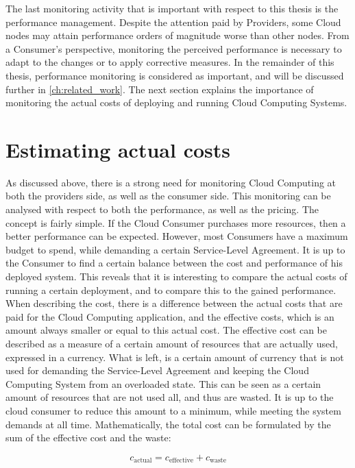 \noindent
The last monitoring activity that is important with respect to this thesis is the performance management. Despite the attention paid by Providers, some Cloud nodes may attain performance orders of magnitude worse than other nodes. From a Consumer's perspective, monitoring the perceived performance is necessary to adapt to the changes or to apply corrective measures. In the remainder of this thesis, performance monitoring is considered as important, and will be discussed further in \autoref{ch:related_work}. The next section explains the importance of monitoring the actual costs of deploying and running Cloud Computing Systems.

\section{Estimating actual costs} \label{sec:intro_pricing}
As discussed above, there is a strong need for monitoring Cloud Computing at both the providers side, as well as the consumer side. This monitoring can be analysed with respect to both the performance, as well as the pricing. The concept is fairly simple. If the Cloud Consumer purchases more resources, then a better performance can be expected. However, most Consumers have a maximum budget to spend, while demanding a certain Service-Level Agreement. It is up to the Consumer to find a certain balance between the cost and performance of his deployed system. This reveals that it is interesting to compare the actual costs of running a certain deployment, and to compare this to the gained performance. When describing the cost, there is a difference between the actual costs that are paid for the Cloud Computing application, and the effective costs, which is an amount always smaller or equal to this actual cost. The effective cost can be described as a measure of a certain amount of resources that are actually used, expressed in a currency. What is left, is a certain amount of currency that is not used for demanding the Service-Level Agreement and keeping the Cloud Computing System from an overloaded state. This can be seen as a certain amount of resources that are not used all, and thus are wasted. It is up to the cloud consumer to reduce this amount to a minimum, while meeting the system demands at all time. Mathematically, the total cost can be formulated by the sum of the effective cost and the waste:

\begin{equation}\label{eq:intro}
  c_\text{actual} = c_\text{effective} + c_\text{waste}  
\end{equation}

